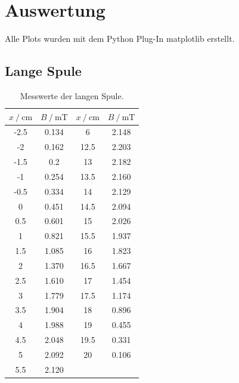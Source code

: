 \section{Auswertung}
\label{sec:Auswertung}
Alle Plots wurden mit dem Python Plug-In matplotlib \cite{matplotlib} erstellt.
\subsection{Lange Spule}

\FloatBarrier

\begin{table}
\centering
\caption{Messwerte der langen Spule.}
\begin{tabular}{cc|cc}
  \toprule
  $x \:/\: \si{\centi\meter}$ & $B \:/\: \si{\milli\tesla}$ & $x \:/\: \si{\centi\meter}$ & $B \:/\: \si{\milli\tesla}$ \\
  \midrule
  -2.5 & 0.134 &  6 & 2.148  \\
  -2 & 0.162 & 12.5 & 2.203 \\
  -1.5 & 0.2 &  13 & 2.182 \\
  -1 & 0.254 & 13.5 & 2.160 \\
  -0.5 & 0.334 &  14 & 2.129 \\ 
  0 & 0.451  & 14.5 & 2.094 \\
  0.5 & 0.601 & 15 & 2.026 \\
  1 & 0.821  & 15.5 & 1.937 \\
  1.5 & 1.085  & 16 & 1.823 \\
  2 & 1.370  & 16.5 & 1.667 \\
  2.5 & 1.610  &  17 & 1.454 \\
  3 & 1.779  & 17.5 & 1.174 \\
  3.5 & 1.904  & 18 & 0.896 \\
  4 & 1.988 & 19 & 0.455 \\
  4.5 & 2.048  &  19.5 & 0.331 \\
  5 & 2.092  & 20 & 0.106 \\
  5.5 & 2.120 & & \\
  \bottomrule
\end{tabular}
\label{tab:long}
\end{table}

